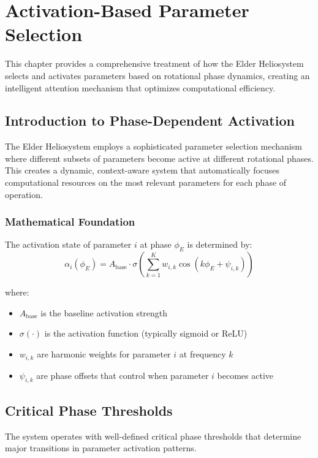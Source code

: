 \chapter{Activation-Based Parameter Selection}

This chapter provides a comprehensive treatment of how the Elder Heliosystem selects and activates parameters based on rotational phase dynamics, creating an intelligent attention mechanism that optimizes computational efficiency.

\section{Introduction to Phase-Dependent Activation}

The Elder Heliosystem employs a sophisticated parameter selection mechanism where different subsets of parameters become active at different rotational phases. This creates a dynamic, context-aware system that automatically focuses computational resources on the most relevant parameters for each phase of operation.

\subsection{Mathematical Foundation}

The activation state of parameter $i$ at phase $\phi_E$ is determined by:
\begin{equation}
\alpha_i(\phi_E) = A_{\text{base}} \cdot \sigma\left(\sum_{k=1}^{K} w_{i,k} \cos(k\phi_E + \psi_{i,k})\right)
\end{equation}

where:
\begin{itemize}
    \item $A_{\text{base}}$ is the baseline activation strength
    \item $\sigma(\cdot)$ is the activation function (typically sigmoid or ReLU)
    \item $w_{i,k}$ are harmonic weights for parameter $i$ at frequency $k$
    \item $\psi_{i,k}$ are phase offsets that control when parameter $i$ becomes active
\end{itemize}

\section{Critical Phase Thresholds}

The system operates with well-defined critical phase thresholds that determine major transitions in parameter activation patterns.

